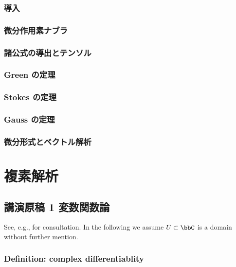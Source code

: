\documentclass[openany, a4paper, oneside]{jsbook}
\begin{document}
\section{導入}

\section{微分作用素ナブラ}

\section{諸公式の導出とテンソル}

\section{Green の定理}

\section{Stokes の定理}

\section{Gauss の定理}

\section{微分形式とベクトル解析}

\part{複素解析}

\chapter{講演原稿 1 変数関数論}

See, e.g., \cite{MitsuoSugiura2} for consultation.
In the following we assume $U \subset \bbC$ is a domain without further mention.
\section{Definition: complex differentiablity}
\end{document}
